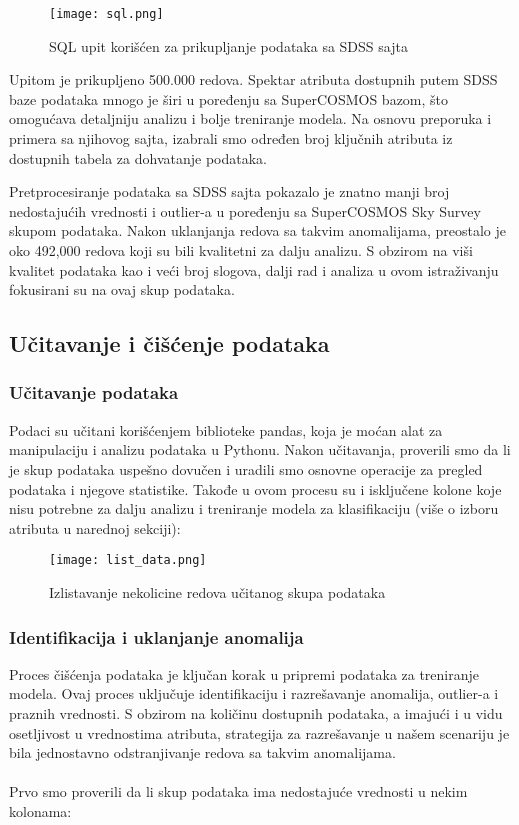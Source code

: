 \documentclass[a4paper,12pt]{article}
\begin{document}
\begin{figure}[H]
\centering
\texttt{[image: sql.png]}
\caption{SQL upit korišćen za prikupljanje podataka sa SDSS sajta}
\label{fig:sql_query}
\end{figure}

Upitom je prikupljeno 500.000 redova. Spektar atributa dostupnih putem SDSS baze podataka mnogo je širi u poređenju sa SuperCOSMOS bazom, što omogućava detaljniju analizu i bolje treniranje modela. Na osnovu preporuka i primera sa njihovog sajta, izabrali smo određen broj ključnih atributa iz dostupnih tabela za dohvatanje podataka.

Pretprocesiranje podataka sa SDSS sajta pokazalo je znatno manji broj nedostajućih vrednosti i outlier-a u poređenju sa SuperCOSMOS Sky Survey skupom podataka. Nakon uklanjanja redova sa takvim anomalijama, preostalo je oko 492,000 redova koji su bili kvalitetni za dalju analizu. S obzirom na viši kvalitet podataka kao i veći broj slogova, dalji rad i analiza u ovom istraživanju fokusirani su na ovaj skup podataka.

\subsection{Učitavanje i čišćenje podataka}


\subsubsection{Učitavanje podataka}
Podaci su učitani korišćenjem biblioteke pandas, koja je moćan alat za manipulaciju i analizu podataka u Pythonu. Nakon učitavanja, proverili smo da li je skup podataka uspešno dovučen i uradili smo osnovne operacije za pregled podataka i njegove statistike. Takođe u ovom procesu su i isključene kolone koje nisu potrebne za dalju analizu i treniranje modela za klasifikaciju (više o izboru atributa u narednoj sekciji):

\begin{figure}[H]
\centering
\texttt{[image: list\_data.png]}
\caption{Izlistavanje nekolicine redova učitanog skupa podataka}
\label{fig:sql_query}
\end{figure}

\subsubsection{Identifikacija i uklanjanje anomalija}
Proces čišćenja podataka je ključan korak u pripremi podataka za treniranje modela. Ovaj proces uključuje identifikaciju i razrešavanje anomalija, outlier-a i praznih vrednosti. S obzirom na količinu dostupnih podataka, a imajući i u vidu osetljivost u vrednostima atributa, strategija za razrešavanje u našem scenariju je bila jednostavno odstranjivanje redova sa takvim anomalijama.\\\\
Prvo smo proverili da li skup podataka ima nedostajuće vrednosti u nekim kolonama:
\end{document}
